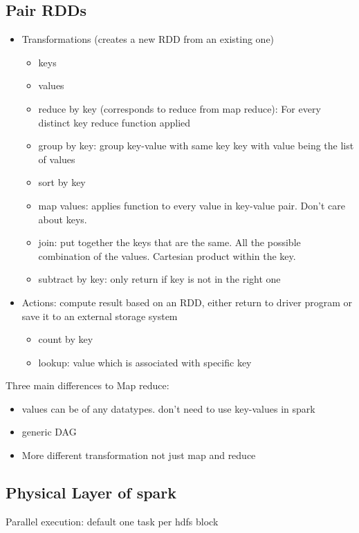 \subsection{Pair RDDs}
\begin{itemize}
    \item Transformations (creates a new RDD from an existing one)
    \begin{itemize}
        \item keys
        \item values
        \item reduce by key (corresponds to reduce from map reduce): For every distinct key reduce function applied
        \item group by key: group key-value with same key \textrightarrow key with value being the list of values
        \item sort by key
        \item map values: applies function to every value in key-value pair. Don't care about keys.
        \item join: put together the keys that are the same.
        All the possible combination of the values. Cartesian product within the key.
        \item subtract by key: only return if key is not in the right one
    \end{itemize}
    \item Actions: compute result based on an RDD, either return to driver program or save it to an external storage system
    \begin{itemize}
        \item count by key
        \item lookup: value which is associated with specific key
    \end{itemize}
\end{itemize}

Three main differences to Map reduce:
\begin{itemize}
    \item values can be of any datatypes. don't need to use key-values in spark
    \item generic DAG
    \item More different transformation not just map and reduce
\end{itemize}


\subsection{Physical Layer of spark}
Parallel execution: default one task per hdfs block

